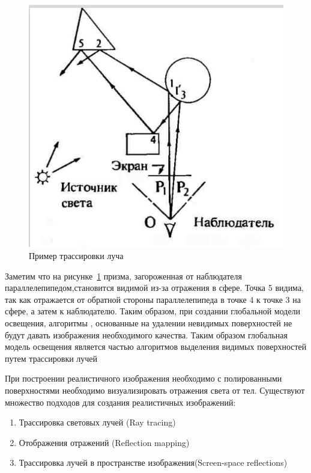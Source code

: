 \documentclass[a4paper,14pt,unknownkeysallowed]{extreport}
\begin{document}
\begin{figure}[H]
	\centering
	\includegraphics{global_model_light.png}
	\caption{Пример трассировки луча}
	\label{fig:global_model_light}
\end{figure} 

Заметим что на рисунке~\ref{fig:global_model_light}  призма, загороженная от наблюдателя параллелепипедом,становится видимой из-за отражения в сфере.
Точка 5 видима, так как отражается от обратной стороны параллелепипеда в точке 4 к точке 3 на сфере, а затем к наблюдателю.
Таким образом, при создании глобальной модели освещения, алгоритмы , основанные на удалении невидимых поверхностей не будут давать изображения необходимого качества.
Таким образом глобальная модель освещения является частью алгоритмов выделения видимых поверхностей путем трассировки лучей\cite{Rodgers}


При построении реалистичного изображения необходимо с полированными поверхностями необходимо визуализировать отражения света от тел.
Существуют множество подходов для создания реалистичных изображений:
\begin{enumerate}
	\item Трассировка световых лучей (Ray tracing)
	\item Отображения отражений (Reflection mapping)
	\item Трассировка лучей в пространстве изображения(Screen-space reflections)
\end{enumerate}
\end{document}
